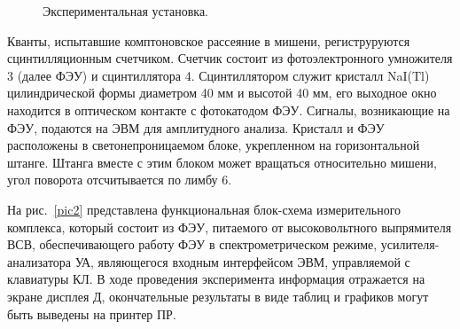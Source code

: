 \documentclass[a4paper,12pt]{article} %
\begin{document}
	
	\begin{figure}[h!]
		{\caption{Экспериментальная установка.}}
	\end{figure}
	
	Кванты, испытавшие комптоновское рассеяние в мишени, региструруются сцинтилляционным счетчиком. Счетчик состоит из фотоэлектронного умножителя 3 (далее ФЭУ) и сцинтиллятора 4. Сцинтиллятором служит кристалл NaI(Tl) цилиндрической формы диаметром 40 мм и высотой 40 мм, его выходное окно находится в оптическом контакте с фотокатодом ФЭУ. Сигналы, возникающие на ФЭУ, подаются на ЭВМ для амплитудного анализа. Кристалл и ФЭУ расположены в светонепроницаемом блоке, укрепленном на горизонтальной штанге. Штанга вместе с этим блоком может вращаться относительно мишени, угол поворота отсчитывается по лимбу 6.
	
	На рис.~\ref{pic2} представлена функциональная блок-схема измерительного комплекса, который состоит из ФЭУ, питаемого от высоковольтного выпрямителя ВСВ, обеспечивающего работу ФЭУ в спектрометрическом режиме, усилителя-анализатора УА, являющегося входным интерфейсом ЭВМ, управляемой с клавиатуры КЛ. В ходе проведения эксперимента информация отражается на экране дисплея Д, окончательные результаты в виде таблиц и графиков могут быть выведены на принтер ПР.
	
\end{document}
